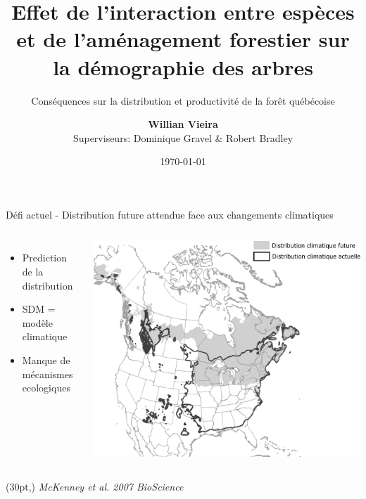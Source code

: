 \documentclass[11pt, compress, aspectratio=1610]{beamer}
\title{Effet de l’interaction entre espèces et de l’aménagement forestier sur
la démographie des arbres}
\subtitle{Conséquences sur la distribution et productivité de la forêt québécoise}
\date{\today}
\author{\textbf{Willian Vieira}\\
Superviseurs: Dominique Gravel \& Robert Bradley \newline}
\institute{}
\newcommand\smallcitation[1]{%
\begin{textblock*}{\textwidth}(30pt,\textheight)
	\raggedleft \footnotesize\textit{#1}
\end{textblock*}}
\providecommand{\tightlist}{%
  \setlength{\itemsep}{0pt}\setlength{\parskip}{0pt}}
\newcommand{\begincols}{\begin{columns}}
\newcommand{\stopcols}{\end{columns}}
\begin{document}
\maketitle

\begin{frame}{Défi actuel - Distribution future attendue face aux
changements climatiques}
\protect\hypertarget{duxe9fi-actuel---distribution-future-attendue-face-aux-changements-climatiques}{}

\begincols
{}
  \begin{itemize}
  \tightlist
  \item
    Prediction de la distribution
  \item
    SDM = modèle climatique
  \item
    Manque de mécanismes ecologiques
\end{itemize}
\hfill{}
  \centering

\includegraphics[scale=0.4]{figures/mckenney.pdf}

\par
\stopcols

\smallcitation{McKenney \textit{et al}. 2007 BioScience}

\end{frame}
\end{document}
